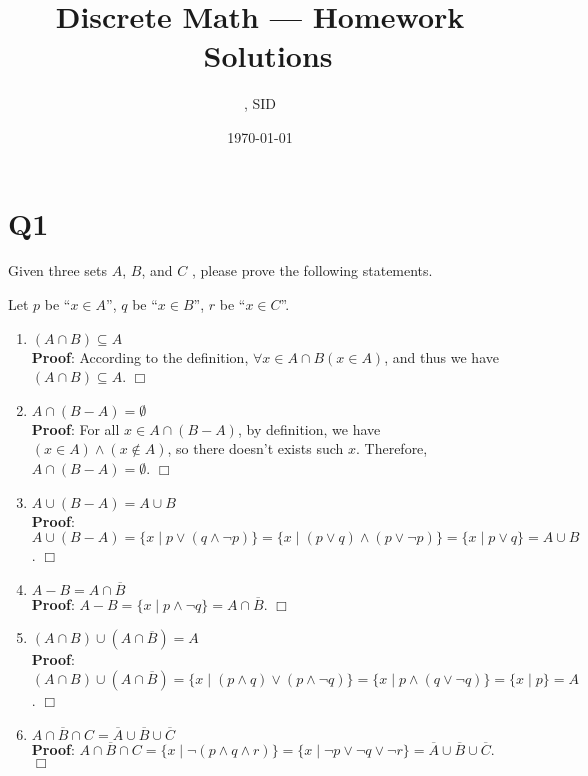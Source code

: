 \documentclass[11pt]{article}
\title{Discrete Math --- Homework \Homework \ Solutions}
\author{\Name, SID \SID}
\date{\today}
\newenvironment{qparts}{\begin{enumerate}[{(}a{)}]}{\end{enumerate}}
\def\endproofmark{$\Box$}
\newenvironment{proof}{{\bf Proof}:}{\endproofmark\smallskip}
\begin{document}
\maketitle

\section*{Q1}
Given three sets $A$, $B$, and $C$ , please prove the following statements.

Let $p$ be ``$x \in A$'', $q$ be ``$x \in B$'', $r$ be ``$x \in C$''.
\begin{qparts}
    
    \item $(A \cap B) \subseteq A$ \\
    \begin{proof}
        According to the definition, 
        $\forall x \in A \cap B (x \in A)$, and 
        thus we have $(A \cap B) \subseteq A$.
    \end{proof}

    \item $A \cap (B-A)=\emptyset$ \\
    \begin{proof}
        For all $x \in A \cap (B-A)$, 
        by definition, 
        we have $(x \in A)\land (x \notin A)$, 
        so there doesn't exists such $x$. Therefore, $A \cap (B-A)=\emptyset$.
    \end{proof}

    \item $A \cup (B-A)=A \cup B$ \\
    \begin{proof}
        $A \cup (B-A)=
        \{ x \mid p \lor (q \land \lnot p)\}
        =\{ x \mid (p \lor q) \land  (p \lor \lnot p)\}
        =\{ x \mid p \lor q \}
        =A \cup B$.
    \end{proof}

    \item $A-B=A \cap \overline{B}$\\
    \begin{proof}
        $A-B=
        \{ x \mid p \land \lnot q \}
        =A \cap \overline{B}$.
    \end{proof}

    \item $(A \cap B)\cup (A \cap \overline{B})=A$\\
    \begin{proof}
        $(A \cap B)\cup (A \cap \overline{B})
        =\{ x \mid (p \land q) \lor (p \land \lnot q) \}
        =\{ x \mid p \land (q \lor \lnot q) \}
        =\{ x \mid p \}
        =A$.
    \end{proof}

    \item $\overline{A \cap B \cap C}=
    \overline{A}\cup \overline{B}\cup \overline{C}$\\
    \begin{proof}
        $\overline{A \cap B \cap C}
        =\{ x \mid \lnot (p \land q \land r) \}
        =\{ x \mid \lnot p \lor \lnot q \lor \lnot r \}
        =\overline{A}\cup \overline{B}\cup \overline{C}$.
    \end{proof}
\end{qparts}
\end{document}
